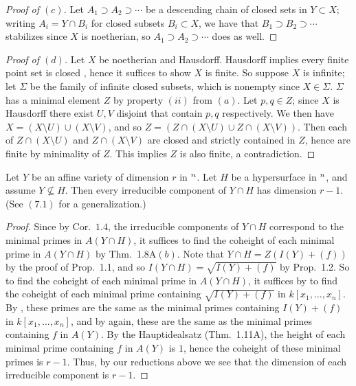 \documentclass[10pt]{article}
\theoremstyle{definition}
\theoremstyle{remark}
\numberwithin{equation}{section}
\numberwithin{figure}{subsubsection}
\let\AA\relax
\DeclareMathOperator{\AA}{\mathbf{A}}
\begin{document}
\begin{proof}[Proof of $(c)$]
  Let $A_1 \supset A_2 \supset \cdots$ be a descending chain of closed sets
  in $Y \subset X$; writing $A_i = Y \cap B_i$ for closed subsets
  $B_i \subset X$, we have that $B_1 \supset B_2 \supset \cdots$ stabilizes
  since $X$ is noetherian, so $A_1 \supset A_2 \supset \cdots$ does as well.
\end{proof}
\begin{proof}[Proof of $(d)$]
  Let $X$ be noetherian and Hausdorff.
  Hausdorff implies every finite point set is closed \cite[Thm.~17.8]{Mun00},
  hence it suffices to show $X$ is finite.
  So suppose $X$ is infinite; let $\Sigma$ be the family of infinite closed
  subsets, which is nonempty since $X \in \Sigma$.
  $\Sigma$ has a minimal element $Z$ by property $(ii)$ from $(a)$.
  Let $p,q \in Z$; since $X$ is Hausdorff there exist $U,V$ disjoint that
  contain $p,q$ respectively.
  We then have $X = (X \setminus U) \cup (X \setminus V)$, and so
  $Z = (Z \cap (X \setminus U) \cup Z\cap(X \setminus V))$.
  Then each of $Z \cap (X \setminus U)$ and $Z \cap (X \setminus V)$ are
  closed and strictly contained in $Z$, hence are finite by minimality of $Z$.
  This implies $Z$ is also finite, a contradiction.
\end{proof}

\begin{problem}\label{exc:I.1.8}
  Let $Y$ be an affine variety of dimension $r$ in $\AA^n$.
  Let $H$ be a hypersurface in $\AA^n$, and assume $Y \not\subseteq H$.
  Then every irreducible component of $Y \cap H$ has dimension $r-1$.
  (See $(7.1)$ for a generalization.)
\end{problem}
\begin{proof}
  Since by Cor.~$1.4$, the irreducible components of $Y \cap H$ correspond to
  the minimal primes in $A(Y \cap H)$, it suffices to find the coheight of each
  minimal prime in $A(Y \cap H)$ by Thm.~1.8A$(b)$.
  Note that $Y \cap H = Z(I(Y) + (f))$ by the proof of Prop.~1.1, and so
  $I(Y \cap H) = \sqrt{I(Y) + (f)}$ by Prop.~1.2.
  So to find the coheight of each minimal prime in $A(Y \cap H)$, it suffices by
  \cite[Prop.~1.1]{AM69} to find the coheight of each minimal prime containing
  $\sqrt{I(Y) + (f)}$ in $k[x_1,\ldots,x_n]$.
  By \cite[Prop.~1.14]{AM69}, these primes are the same as the minimal primes
  containing $I(Y) + (f)$ in $k[x_1,\ldots,x_n]$, and by \cite[Prop.~1.1]{AM69}
  again, these are the same as the minimal primes containing $f$ in $A(Y)$.
  By the Hauptidealsatz (Thm.~1.11A), the height of each minimal prime
  containing $f$ in $A(Y)$ is $1$, hence the coheight of these minimal primes is
  $r-1$.
  Thus, by our reductions above we see that the dimension of each irreducible
  component is $r-1$.
\end{proof}
\end{document}

